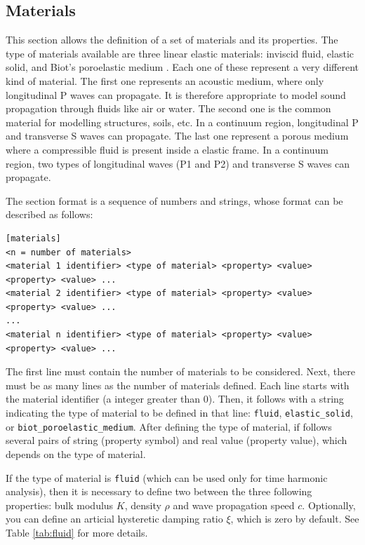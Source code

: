 \documentclass[a4paper,fleqn]{book}
\begin{document}
\subsection{Materials}

This section allows the definition of a set of materials and its properties. The type of materials available are three linear elastic materials: inviscid fluid, elastic solid, and Biot's poroelastic medium \cite{biot1956}. Each one of these represent a very different kind of material. The first one represents an acoustic medium, where only longitudinal P waves can propagate. It is therefore appropriate to model sound propagation through fluids like air or water. The second one is the common material for modelling structures, soils, etc. In a continuum region, longitudinal P and transverse S waves can propagate. The last one represent a porous medium where a compressible fluid is present inside a elastic frame. In a continuum region, two types of longitudinal waves (P1 and P2) and transverse S waves can propagate.

The section format is a sequence of numbers and strings, whose format can be described as follows:
\begin{Verbatim}[frame=single, fontsize=\small, label={general format of section [materials]}]
[materials]
<n = number of materials>
<material 1 identifier> <type of material> <property> <value> <property> <value> ...
<material 2 identifier> <type of material> <property> <value> <property> <value> ...
...
<material n identifier> <type of material> <property> <value> <property> <value> ...
\end{Verbatim}
The first line must contain the number of materials to be considered. Next, there must be as many lines as the number of materials defined. Each line starts with the material identifier (a integer greater than 0). Then, it follows with a string indicating the type of material to be defined in that line: \texttt{fluid}, \texttt{elastic\_solid}, or \texttt{biot\_poroelastic\_medium}. After defining the type of material, if follows several pairs of string (property symbol) and real value (property value), which depends on the type of material. 

If the type of material is \texttt{fluid} (which can be used only for time harmonic analysis), then it is necessary to define two between the three following properties: bulk modulus $K$, density $\rho$ and wave propagation speed $c$. Optionally, you can define an articial hysteretic damping ratio $\xi$, which is zero by default. See Table \ref{tab:fluid} for more details.
\end{document}
